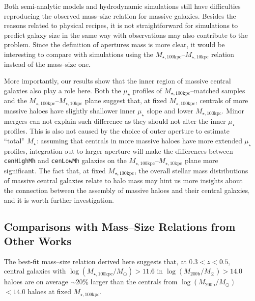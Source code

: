 \documentclass[a4paper,fleqn,usenatbib]{mnras}
\def\rbcg{\texttt{cenHighMh}}
\def\nbcg{\texttt{cenLowMh}}
\def\mstar{{$M_{\star}$}}
\def\logmhalo{{$\log (M_{\mathrm{200b}}/M_{\odot})$}}
\def\minn{{$M_{\star,10\mathrm{kpc}}$}}
\def\mtot{{$M_{\star,100\mathrm{kpc}}$}}
\def\logmtot{{$\log (M_{\star,100\mathrm{kpc}}/M_{\odot})$}}
\def\mden{{$\mu_{\star}$}}
\begin{document}
    Both semi-analytic models and hydrodynamic simulations still have difficulties 
    reproducing the observed mass--size relation for massive galaxies. 
    Besides the reasons related to physical recipes, it is not straightforward for 
    simulations to predict galaxy size in the same way with observations may also 
    contribute to the problem. 
    Since the definition of apertures mass is more clear, it would be interesting 
    to compare with simulations using the \mtot{}--\minn{} relation instead of the 
    mass--size one. 
    
    More importantly, our results show that the inner region of massive central 
    galaxies also play a role here. 
    Both the \mden{} profiles of \mtot{}--matched samples and the \mtot{}--\minn{}
    plane suggest that, at fixed \mtot{}, centrals of more massive haloes have 
    slightly shallower inner \mden{} slope and lower \mtot{}.  
    Minor mergers can not explain such difference as they should not alter the inner 
    \mden{} profiles. 
    This is also not caused by the choice of outer aperture to estimate ``total''
    \mstar{}: assuming that centrals in more massive haloes have more extended 
    \mden{} profiles, integration out to larger aperture will make the differences 
    between \rbcg{} and \nbcg{} galaxies on the \mtot{}--\minn{} plane more significant. 
    The fact that, at fixed \mtot{}, the overall stellar mass distributions of massive
    central galaxies relate to halo mass may hint us more insights about the connection 
    between the assembly of massive haloes and their central galaxies, and it is worth 
    further investigation. 
    

\subsection{Comparisons with Mass--Size Relations from Other Works}

    The best-fit mass--size relation derived here suggests that, at $0.3 < z < 0.5$, 
    central galaxies with \logmtot{}$>11.6$ in \logmhalo{}$>14.0$ haloes are on average
    $\sim20$\% larger than the centrals from \logmhalo{}$<14.0$ haloes at fixed \mtot{}.
    
\end{document}
